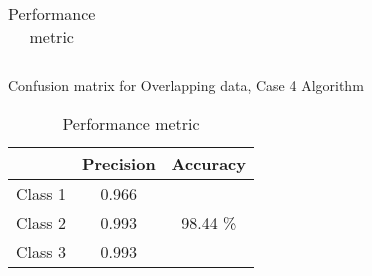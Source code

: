 \documentclass[11pt,paper=a4,answers]{exam}
\begin{document}
\begin{questions}
\begin{enumerate}[i.]
\begin{enumerate}
\begin{table}[ht]
\begin{tabular}{c | c c c c | c | c |}
                    \end{tabular}
                    \caption{Confusion matrix for Overlapping data, Case 4 Algorithm}
                    \label{tab:d3con4}
                \endminipage\hfill
                    \begin{tabular}{| l | c | c |}
                        \hline
                        & Precision & Accuracy\\
                        \hline
                        Class 1 & 0.966 & \\
                        \cline{1-2}
                        Class 2 & 0.993 & 98.44 \%\\
                        \cline{1-2}
                        Class 3 & 0.993 & \\
                        \hline
                    \end{tabular}
                    \caption{Performance metric}
                \endminipage\hfill
            \end{table}\\


\end{enumerate}
\end{enumerate}
\end{questions}
\end{document}
